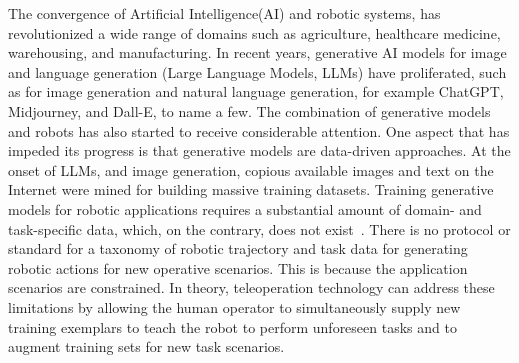 The convergence of Artificial Intelligence(AI) and robotic systems, has revolutionized a wide range of domains such as agriculture, healthcare medicine, warehousing, and manufacturing. In recent years, generative AI models for image and language generation (Large Language Models, LLMs) have proliferated, such as for image generation and natural language generation, for example ChatGPT, Midjourney, and Dall-E, to name a few. The combination of generative models and robots has also started to receive considerable attention. One aspect that has impeded its progress is that generative models are data-driven approaches. At the onset of LLMs, and image generation, copious available images and text on the Internet were mined for building massive training datasets. Training generative models for robotic applications requires a substantial amount of domain- and task-specific data, which, on the contrary, does not exist~\cite{hamalainen_affordance_2019}. There is no protocol or standard for a taxonomy of robotic trajectory and task data for generating robotic actions for new operative scenarios. This is because the application scenarios are constrained. In theory, teleoperation technology can address these limitations by allowing the human operator to simultaneously supply new training exemplars to teach the robot to perform unforeseen tasks and to augment training sets for new task scenarios. 


